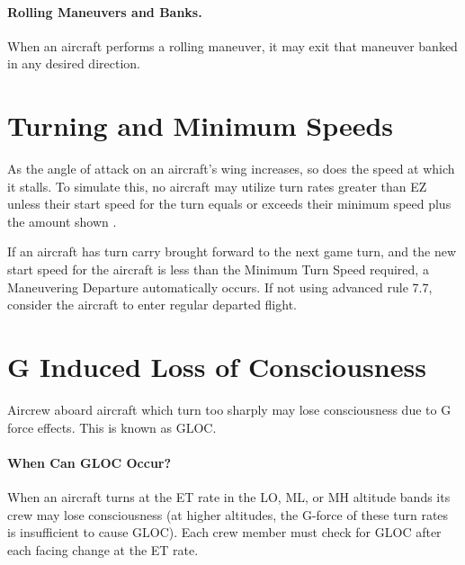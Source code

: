 \paragraph{Rolling Maneuvers and Banks.} When an aircraft performs a rolling maneuver, it may exit that maneuver banked in any desired direction.

\section{Turning and Minimum Speeds}

As the angle of attack on an aircraft's wing increases, so does the speed at which it stalls. To simulate this, no aircraft may utilize turn rates greater than EZ unless their start speed for the turn equals or exceeds their minimum speed plus the amount shown .



If an aircraft has turn carry brought forward to the next game turn, and the new start speed for the aircraft is less than the Minimum Turn Speed required, a Maneuvering Departure automatically occurs. If not using advanced rule 7.7, consider the aircraft to enter regular departed flight.

\section{G Induced Loss of Consciousness}
\label{rule:gloc}

Aircrew aboard aircraft which turn too sharply may lose consciousness due to G force effects. This is known as GLOC.

\paragraph{When Can GLOC Occur?} When an aircraft turns at the ET rate in the LO, ML, or MH altitude bands its crew may lose consciousness (at higher altitudes, the G-force of these turn rates is insufficient to cause GLOC). Each crew member must check for GLOC after each facing change at the ET rate.


